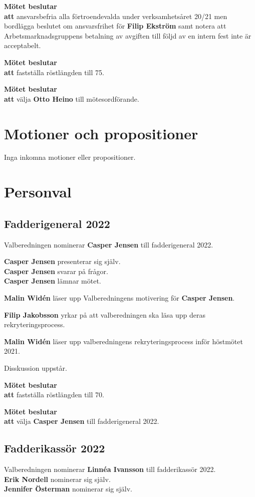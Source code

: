 \documentclass{datateknologsektionen-document}
\newcommand{\ind}{\hspace*{2em}}
\newcommand{\motetbeslutar}{\textbf{Mötet beslutar}}
\newcommand{\att}{\\\ind\textbf{att}}
\begin{document}
\motetbeslutar
\att{} ansvarsbefria alla förtroendevalda under verksamhetsåret 20/21 men bordlägga beslutet om ansvarsfrihet för \textbf{Filip Ekström} samt notera att Arbetsmarknadsgruppens betalning av avgiften till följd av en intern fest inte är acceptabelt.

\motetbeslutar
\att{} fastställa röstlängden till 75.

\motetbeslutar
\att{} välja \textbf{Otto Heino} till mötesordförande.



\section{Motioner och propositioner}
Inga inkomna motioner eller propositioner. 


\pagebreak
\section{Personval}
\subsection{Fadderigeneral 2022}
Valberedningen nominerar \textbf{Casper Jensen} till fadderigeneral 2022.

\textbf{Casper Jensen} presenterar sig själv.\\
\textbf{Casper Jensen} svarar på frågor.\\
\textbf{Casper Jensen} lämnar mötet. 

\textbf{Malin Widén} läser upp Valberedningens motivering för \textbf{Casper Jensen}.

\textbf{Filip Jakobsson} yrkar på att valberedningen ska läsa upp deras rekryteringsprocess.

\textbf{Malin Widén} läser upp valberedningens rekryteringsprocess inför höstmötet 2021.

Disskussion uppstår.

\motetbeslutar
\att{} fastställa röstlängden till 70.

\motetbeslutar
\att{} välja \textbf{Casper Jensen} till fadderigeneral 2022.

\subsection{Fadderikassör 2022}
Valberedningen nominerar \textbf{Linnéa Ivansson} till fadderikassör 2022.\\
\textbf{Erik Nordell} nominerar sig själv.\\
\textbf{Jennifer Österman} nominerar sig själv.
\end{document}
